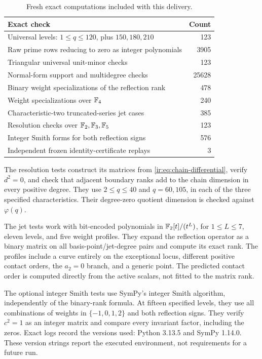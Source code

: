 \begin{table}[ht]
\centering\small
\begin{tabular}{p{}r}
\toprule
Exact check & Count\\
\midrule
Universal levels: $1\le q\le120$, plus $150,180,210$ &123\\
Raw prime rows reducing to zero as integer polynomials &3905\\
Triangular universal unit-minor checks &123\\
Normal-form support and multidegree checks &25628\\
Binary weight specializations of the reflection rank &478\\
Weight specializations over $\mathbb F_4$ &240\\
Characteristic-two truncated-series jet cases &385\\
Resolution checks over $\mathbb F_2,\mathbb F_3,\mathbb F_5$ &123\\
Integer Smith forms for both reflection signs &576\\
Independent frozen identity-certificate replays &3\\
\bottomrule
\end{tabular}
\caption{Fresh exact computations included with this delivery.}
\label{ir:tab:tests}
\end{table}

The resolution tests construct its matrices from
\eqref{ir:eq:chain-differential}, verify $d^2=0$, and check that
adjacent boundary ranks add to the chain dimension in every positive
degree. They use $2\le q\le40$ and $q=60,105$, in each of the three
specified characteristics. Their degree-zero quotient dimension is
checked against $\varphi(q)$.

The jet tests work with bit-encoded polynomials in
$\mathbb F_2[t]/(t^L)$, for $1\le L\le7$, eleven levels, and five weight
profiles. They expand the reflection operator as a binary matrix on
all basis-point/jet-degree pairs and compute its exact rank. The
profiles include a curve entirely on the exceptional locus, different
positive contact orders, the $a_2=0$ branch, and a generic point.
The predicted contact order is computed directly from the active
scalars, not fitted to the matrix rank.

The optional integer Smith tests use SymPy's integer Smith algorithm,
independently of the binary-rank formula. At fifteen specified levels,
they use all combinations of weights in $\{-1,0,1,2\}$ and both
reflection signs. They verify $c^2=1$ as an integer matrix and compare
every invariant factor, including the zeros. Exact logs record the
versions used: Python 3.13.5 and SymPy 1.14.0. These version strings
report the executed environment, not requirements for a future run.

